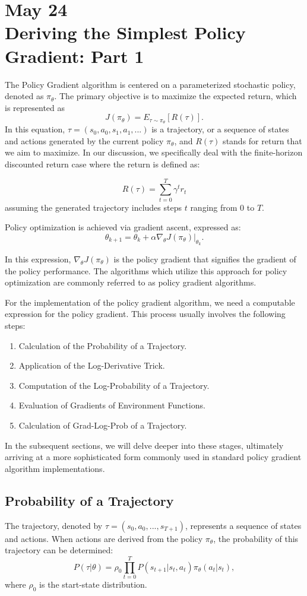 
\section{May 24\\ 
{\large Deriving the Simplest Policy Gradient: Part 1}}
The Policy Gradient algorithm is centered on a parameterized stochastic policy, denoted as $\pi_{\theta}$. The primary objective is to maximize the expected return, which is represented as
$$J(\pi_{\theta}) = E_{\tau \sim \pi_{\theta}}\left[{R(\tau)}\right]. $$
In this equation, $\tau=(s_0, a_0, s_1, a_1, ...)$ is a trajectory, or a sequence of states and actions generated by the current policy $\pi_{\theta}$, and $R(\tau)$ stands for return that we aim to maximize. In our discussion, we specifically deal with the finite-horizon discounted return case where the return is defined as:

$$R(\tau) = \sum_{t=0}^{T} \gamma^t r_t$$
assuming the generated trajectory includes steps $t$ ranging from $0$ to $T$.

Policy optimization is achieved via gradient ascent, expressed as:
$$\theta_{k+1} = \theta_k + \alpha \left. \nabla_{\theta} J(\pi_{\theta}) \right|_{\theta_k}.$$

In this expression, $\nabla_{\theta} J(\pi_{\theta})$ is the policy gradient that signifies the gradient of the policy performance. The algorithms which utilize this approach for policy optimization are commonly referred to as policy gradient algorithms.

For the implementation of the policy gradient algorithm, we need a computable expression for the policy gradient. This process usually involves the following steps:

\begin{enumerate}
  \item Calculation of the Probability of a Trajectory.
  \item Application of the Log-Derivative Trick.
  \item Computation of the Log-Probability of a Trajectory.
  \item Evaluation of Gradients of Environment Functions.
  \item Calculation of Grad-Log-Prob of a Trajectory.
\end{enumerate}

In the subsequent sections, we will delve deeper into these stages, ultimately arriving at a more sophisticated form commonly used in standard policy gradient algorithm implementations.

\subsection{Probability of a Trajectory}
The trajectory, denoted by $\tau = (s_0, a_0, ..., s_{T+1})$, represents a sequence of states and actions. When actions are derived from the policy $\pi_{\theta}$, the probability of this trajectory can be determined:
$$
P(\tau|\theta) = \rho_0 \prod_{t=0}^{T} P(s_{t+1}|s_t, a_t) \pi_{\theta}(a_t |s_t),$$
where $\rho_0 $  is the start-state distribution.
